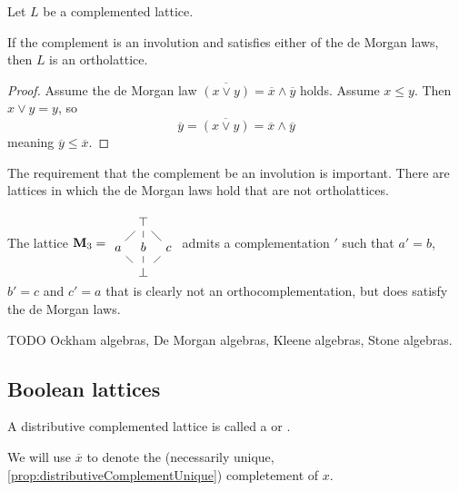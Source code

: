 \begin{proposition}
Let $L$ be a complemented lattice.

If the complement is an involution and satisfies either of the de Morgan laws, then $L$ is an ortholattice.
\end{proposition}
\begin{proof}
Assume the de Morgan law $\overline{(x\vee y)} = \overline{x} \wedge \overline{y}$ holds. Assume $x\leq y$. Then $x\vee y = y$, so
\[ \overline{y} = \overline{(x\vee y)} = \overline{x} \wedge \overline{y} \]
meaning $\overline{y} \leq \overline{x}$.
\end{proof}

The requirement that the complement be an involution is important. There are lattices in which the de Morgan laws hold that are not ortholattices.

\begin{example}
The lattice $\mathbf{M}_3 = \begin{tikzcd}[column sep={2em,between origins},row sep={2em,between origins}]
&\top \ar[ld, dash] \ar[d,dash] \ar[rd, dash] &\\ a \ar[rd, dash]& b \ar[d, dash] & c \ar[ld, dash] \\ &\bot &
\end{tikzcd}$ admits a complementation $'$ such that $a' = b$, $b' = c$ and $c' = a$ that is clearly not an orthocomplementation, but does satisfy the de Morgan laws.
\end{example}

TODO Ockham algebras, De Morgan algebras, Kleene algebras, Stone algebras.

\subsection{Boolean lattices}
\begin{definition}
A distributive complemented lattice is called a  or .
\end{definition}
We will use $\overline{x}$ to denote the (necessarily unique, \ref{prop:distributiveComplementUnique}) completement of $x$.

